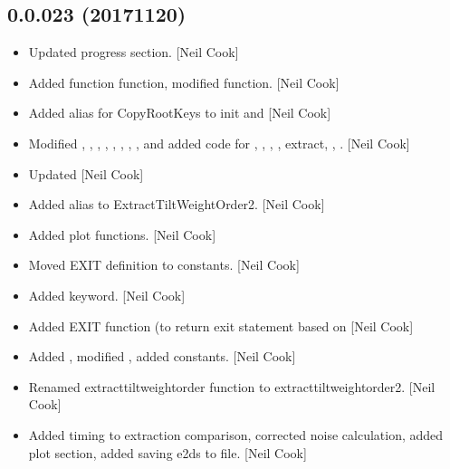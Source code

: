 \documentclass[a4paper,10pt,english]{report}
\begin{document}
\subsection{0.0.023 (2017\sphinxhyphen{}11\sphinxhyphen{}20)}
\label{\detokenize{misc/changelog:id548}}\begin{itemize}
\item {} 
Updated progress section. {[}Neil Cook{]}

\item {} 
Added function  function, modified  function.
{[}Neil Cook{]}

\item {} 
Added alias for CopyRootKeys to init and  {[}Neil Cook{]}

\item {} 
Modified , , ,
, ,
, ,
,  and
 added code for , ,
, , extract, ,
. {[}Neil Cook{]}

\item {} 
Updated  {[}Neil Cook{]}

\item {} 
Added alias to ExtractTiltWeightOrder2. {[}Neil Cook{]}

\item {} 
Added  plot functions. {[}Neil Cook{]}

\item {} 
Moved EXIT definition to constants. {[}Neil Cook{]}

\item {} 
Added  keyword. {[}Neil Cook{]}

\item {} 
Added EXIT function (to return exit statement based on 
{[}Neil Cook{]}

\item {} 
Added , modified , added
 constants. {[}Neil Cook{]}

\item {} 
Renamed extracttiltweightorder function to extracttiltweightorder2.
{[}Neil Cook{]}

\item {} 
Added timing to extraction comparison, corrected noise calculation,
added plot section, added saving e2ds to file. {[}Neil Cook{]}

\end{itemize}
\end{document}
